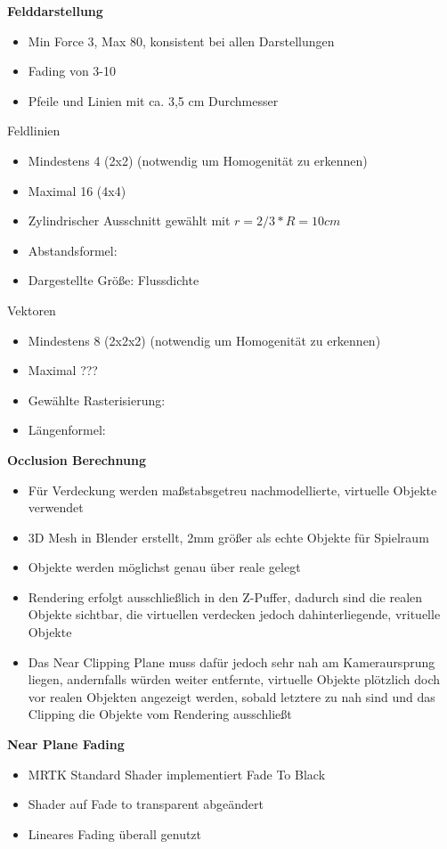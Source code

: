 \textbf{Felddarstellung}
\begin{itemize}
	\item Min Force 3, Max 80, konsistent bei allen Darstellungen
	\item Fading von 3-10
	\item Pfeile und Linien mit ca. 3,5 cm Durchmesser
\end{itemize}
Feldlinien
\begin{itemize}
	\item Mindestens 4 (2x2) (notwendig um Homogenität zu erkennen)
	\item Maximal 16 (4x4)
	\item Zylindrischer Ausschnitt gewählt mit $r=2/3 * R = 10 cm$
	\item Abstandsformel: 
	\item Dargestellte Größe: Flussdichte
\end{itemize}
Vektoren
\begin{itemize}
	\item Mindestens 8 (2x2x2) (notwendig um Homogenität zu erkennen)
	\item Maximal ???
	\item Gewählte Rasterisierung:
	\item Längenformel:
\end{itemize}

\textbf{Occlusion Berechnung}
\begin{itemize}
	\item Für Verdeckung werden maßstabsgetreu nachmodellierte, virtuelle Objekte verwendet
	\item 3D Mesh in Blender erstellt, 2mm größer als echte Objekte für Spielraum
	\item Objekte werden möglichst genau über reale gelegt
	\item Rendering erfolgt ausschließlich in den Z-Puffer, dadurch sind die realen Objekte sichtbar, die virtuellen verdecken jedoch dahinterliegende, vrituelle Objekte
	\item Das Near Clipping Plane muss dafür jedoch sehr nah am Kameraursprung liegen, andernfalls würden weiter entfernte, virtuelle Objekte plötzlich doch vor realen Objekten angezeigt werden, sobald letztere zu nah sind und das Clipping die Objekte vom Rendering ausschließt
\end{itemize}

\textbf{Near Plane Fading}
\begin{itemize}
	\item MRTK Standard Shader implementiert Fade To Black
	\item Shader auf Fade to transparent abgeändert
	\item Lineares Fading überall genutzt
\end{itemize}

